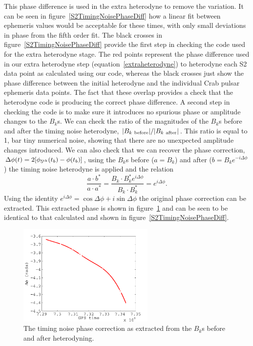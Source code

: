 This phase difference is used in the extra heterodyne to remove the variation. It can be seen in
figure~\ref{S2TimingNoisePhaseDiff} how a linear fit between ephemeris values would be acceptable
for these times, with only small deviations in phase from the fifth order fit. The black crosses in
figure~\ref{S2TimingNoisePhaseDiff} provide the first step in checking the code used for the extra
heterodyne stage. The red points represent the phase difference used in our extra heterodyne step
(equation~\ref{extraheterodyne}) to heterodyne each S2 data point as calculated using our code,
whereas the black crosses just show the phase difference between the initial heterodyne and the
individual Crab pulsar ephemeris data points. The fact that these overlap provides a check that the
heterodyne code is producing the correct phase difference. A second step in checking the code is to
make sure it introduces no spurious phase or amplitude changes to the $B_k$s. We can check the ratio
of the magnitudes of the $B_k$s before and after the timing noise heterodyne, $|B_{k~{\rm
before}}|/|B_{k~{\rm after}}|$. This ratio is equal to 1, bar tiny numerical noise, showing that
there are no unexpected amplitude changes introduced. We can also check that we can recover the
phase correction, $\Delta\phi(t) = 2[\phi_{5^{\rm th}}(t_b) - \phi(t_b)]$, using the $B_k$s before
($a = B_k$) and after ($b = B_ke^{-i\Delta\phi}$) the timing noise heterodyne is applied and the
relation
\begin{equation}
\frac{a\cdot{}b^{\ast}}{a\cdot{}a^{\ast}} =
\frac{B_k\cdot{}B_k^{\ast}e^{i\Delta\phi}}{B_k\cdot{}B_k^{\ast}} = e^{i\Delta\phi}.
\end{equation}
Using the identity $e^{i\Delta\phi} = \cos{\Delta\phi} + i\sin{\Delta\phi}$ the original phase
correction can be extracted. This extracted phase is shown in
figure~\ref{S2TimingNoisePhaseDiffCheck} and can be seen to be identical to that calculated and
shown in figure~\ref{S2TimingNoisePhaseDiff}.
\begin{figure}[!htbp]
\begin{center}
\includegraphics[width=0.6\textwidth]{figs/S2TimingNoisePhaseDiffCheck}
\caption{The timing noise phase correction as extracted from the $B_k$s before and
after heterodyning.}\label{S2TimingNoisePhaseDiffCheck}
\end{center}
\end{figure}

